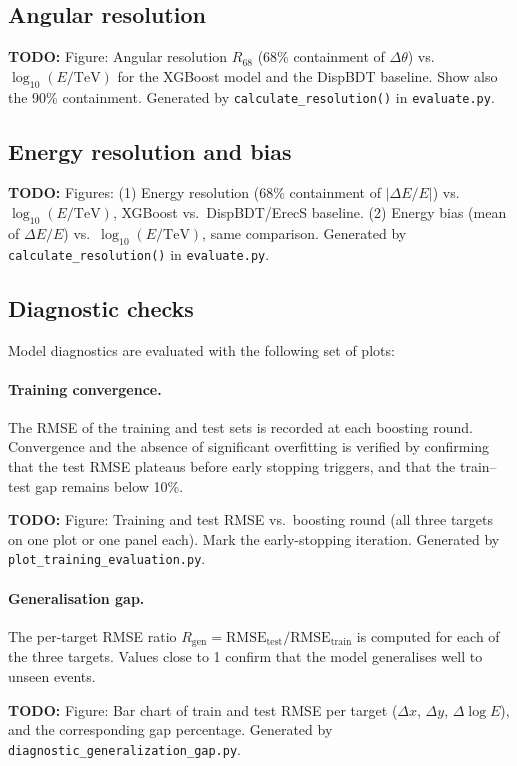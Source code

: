 \documentclass[12pt]{article}
\newcommand{\todo}[1]{\begin{hintBox} \textbf{TODO:} #1 \end{hintBox}}
\begin{document}
\subsection{Angular resolution}

\todo{Figure: Angular resolution $R_{68}$ (68\% containment of $\Delta\theta$) vs.\ $\log_{10}(E/\mathrm{TeV})$ for the XGBoost model and the DispBDT baseline. Show also the 90\% containment.  Generated by \texttt{calculate\_resolution()} in \texttt{evaluate.py}.}

\subsection{Energy resolution and bias}

\todo{Figures: (1) Energy resolution (68\% containment of $|\Delta E/E|$) vs.\ $\log_{10}(E/\mathrm{TeV})$, XGBoost vs.\ DispBDT/ErecS baseline. (2) Energy bias (mean of $\Delta E/E$) vs.\ $\log_{10}(E/\mathrm{TeV})$, same comparison. Generated by \texttt{calculate\_resolution()} in \texttt{evaluate.py}.}

\subsection{Diagnostic checks}

Model diagnostics are evaluated with the following set of plots:

\paragraph{Training convergence.}
The RMSE of the training and test sets is recorded at each boosting round.
Convergence and the absence of significant overfitting is verified by
confirming that the test RMSE plateaus before early stopping triggers,
and that the train--test gap remains below 10\%.
\todo{Figure: Training and test RMSE vs.\ boosting round (all three targets on one plot or one panel each). Mark the early-stopping iteration. Generated by \texttt{plot\_training\_evaluation.py}.}

\paragraph{Generalisation gap.}
The per-target RMSE ratio $R_\mathrm{gen} = \mathrm{RMSE}_\mathrm{test} / \mathrm{RMSE}_\mathrm{train}$
is computed for each of the three targets.
Values close to 1 confirm that the model generalises well to unseen events.
\todo{Figure: Bar chart of train and test RMSE per target ($\Delta x$, $\Delta y$, $\Delta\log E$), and the corresponding gap percentage. Generated by \texttt{diagnostic\_generalization\_gap.py}.}
\end{document}
